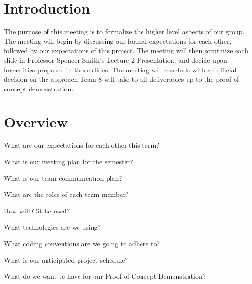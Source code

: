 \documentclass[11pt]{meetingmins}
\begin{document}
\maketitle

\section{Introduction}
The purpose of this meeting is to formalize the higher level aspects of our group. The meeting will begin by discussing our formal expectations for each other, followed by our expectations of this project. The meeting will then scrutinize each slide in Professor Spencer Smith's Lecture 2 Presentation, and decide upon formalities proposed in those slides. The meeting will conclude with an official decision on the approach Team 8 will take to all deliverables up to the proof-of-concept demonstration. 

\section{Overview}
\begin{hiddenitems}

\item
What are our expectations for each other this term?

\item
What is our meeting plan for the semester?

\item
What is our team communication plan?

\item
What are the roles of each team member?

\item
How will Git be used?

\item
What technologies are we using?

\item
What coding conventions are we going to adhere to?

\item
What is our anticipated project schedule?

\item
What do we want to have for our Proof of Concept Demonstration?

\end{hiddenitems}
\end{document}

